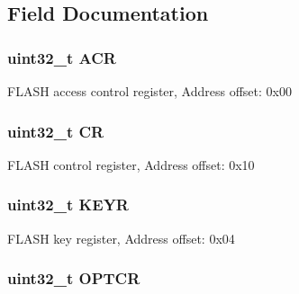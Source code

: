 \subsection{Field Documentation}
\hypertarget{struct_f_l_a_s_h___type_def_a9cb55206b29a8c16354747c556ab8bea}{
\subsubsection[{A\-C\-R}]{ uint32\-\_\-t A\-C\-R}}\label{struct_f_l_a_s_h___type_def_a9cb55206b29a8c16354747c556ab8bea}
F\-L\-A\-S\-H access control register, Address offset\-: 0x00 \hypertarget{struct_f_l_a_s_h___type_def_ab40c89c59391aaa9d9a8ec011dd0907a}{
\subsubsection[{C\-R}]{ uint32\-\_\-t C\-R}}\label{struct_f_l_a_s_h___type_def_ab40c89c59391aaa9d9a8ec011dd0907a}
F\-L\-A\-S\-H control register, Address offset\-: 0x10 \hypertarget{struct_f_l_a_s_h___type_def_a84c491be6c66b1d5b6a2efd0740b3d0c}{
\subsubsection[{K\-E\-Y\-R}]{ uint32\-\_\-t K\-E\-Y\-R}}\label{struct_f_l_a_s_h___type_def_a84c491be6c66b1d5b6a2efd0740b3d0c}
F\-L\-A\-S\-H key register, Address offset\-: 0x04 \hypertarget{struct_f_l_a_s_h___type_def_acfef9b6d7da4271943edc04d7dfdf595}{
\subsubsection[{O\-P\-T\-C\-R}]{ uint32\-\_\-t O\-P\-T\-C\-R}}\label{struct_f_l_a_s_h___type_def_acfef9b6d7da4271943edc04d7dfdf595}

